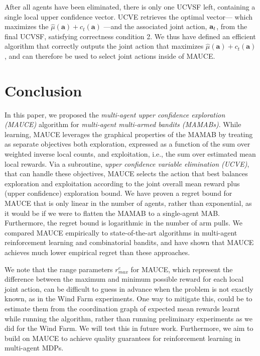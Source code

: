 \documentclass{article}
\newcommand{\est}{\hat{\mu}}
\begin{document}

After all agents have been eliminated, there is only one UCVSF left, containing a single local upper
confidence vector. UCVE retrieves the optimal vector--- which maximizes the $\est(\mathbf{a}) + c_t(\mathbf{a})$ ---and the associated joint action, ${\bf a}_t$, from the final UCVSF, satisfying correctness condition 2. We thus have defined an efficient algorithm that correctly outputs the joint action that maximizes $\est(\mathbf{a}) + c_t(\mathbf{a})$, and can therefore be used to select joint actions inside of MAUCE.





\section{Conclusion}
In this paper, we proposed the \emph{multi-agent upper confidence exploration (MAUCE)} algorithm for
\emph{multi-agent multi-armed bandits (MAMABs)}. While learning, MAUCE leverages the graphical
properties of the MAMAB by treating as separate objectives both exploration, expressed as a function
of the sum over weighted inverse local counts, and exploitation, i.e., the sum over estimated mean
local rewards. Via a subroutine, \emph{upper confidence variable elimination (UCVE)}, that can
handle these objectives, MAUCE selects the action that best balances exploration  and exploitation
according to the joint overall mean reward plus (upper confidence) exploration bound.  We have
proven a regret bound for MAUCE that is only linear in the number of agents, rather than
exponential, as it would be if we were to flatten the MAMAB to a single-agent MAB. Furthermore, the
regret bound is logarithmic in the number of arm pulls.  We compared MAUCE empirically to
state-of-the-art algorithms in multi-agent reinforcement learning and combinatorial bandits, and
have shown that MAUCE achieves much lower empirical regret than these approaches.

We note that the range parameters $r^e_{max}$ for MAUCE, which represent the difference between the maximum and minimum possible reward for each local joint action, can be difficult to guess in advance when the problem is not exactly known, as in the Wind Farm experiments. One way to mitigate this, could be to estimate them from the coordination graph of expected mean rewards learnt while running the algorithm, rather than running preliminary experiments as we did for the Wind Farm. We will test this in future work.
Furthermore, we aim to build on MAUCE to achieve quality guarantees for reinforcement learning in multi-agent MDPs. %
\end{document}
